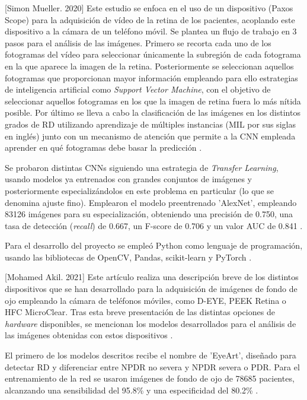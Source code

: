 [Simon Mueller. 2020] Este estudio se enfoca en el uso de un dispositivo (Paxos Scope) para la adquisición de vídeo de la retina de los pacientes, acoplando este dispositivo a la cámara de un teléfono móvil. Se plantea un flujo de trabajo en 3 pasos para el análisis de las imágenes. Primero se recorta cada uno de los fotogramas del vídeo para seleccionar únicamente la subregión de cada fotograma en la que aparece la imagen de la retina. Posteriormente se seleccionan aquellos fotogramas que proporcionan mayor información empleando para ello estrategias de inteligencia artificial como \textit{Support Vector Machine}, con el objetivo de seleccionar aquellos fotogramas en los que la imagen de retina fuera lo más nítida posible. Por último se lleva a cabo la clasificación de las imágenes en los distintos grados de RD utilizando aprendizaje de múltiples instancias (MIL por sus siglas en inglés) junto con un mecanismo de atención que permite a la CNN empleada aprender en qué fotogramas debe basar la predicción \cite{soa:mueller}. 

Se probaron distintas CNNs siguiendo una estrategia de \textit{Transfer Learning}, usando modelos ya entrenados con grandes conjuntos de imágenes y posteriormente especializándolos en este problema en particular (lo que se denomina ajuste fino). Emplearon el modelo preentrenado 'AlexNet', empleando 83126 imágenes para su especialización, obteniendo una precisión de 0.750, una tasa de detección (\textit{recall}) de 0.667, un F-score de 0.706 y un valor AUC de 0.841 \cite{soa:mueller}.

Para el desarrollo del proyecto se empleó Python como lenguaje de programación, usando las bibliotecas de OpenCV, Pandas, scikit-learn y PyTorch \cite{soa:mueller}.

[Mohamed Akil. 2021] Este artículo realiza una descripción breve de los distintos dispositivos que se han desarrollado para la adquisición de imágenes de fondo de ojo empleando la cámara de teléfonos móviles, como D-EYE, PEEK Retina o HFC MicroClear. Tras esta breve presentación de las distintas opciones de \textit{hardware} disponibles, se mencionan los modelos desarrollados para el análisis de las imágenes obtenidas con estos dispositivos \cite{soa:mohamed}. 

El primero de los modelos descritos recibe el nombre de 'EyeArt', diseñado para detectar RD y diferenciar entre NPDR no severa y NPDR severa o PDR. Para el entrenamiento de la red se usaron imágenes de fondo de ojo de 78685 pacientes, alcanzando una sensibilidad del 95.8\% y una especificidad del 80.2\% \cite{soa:mohamed}.

